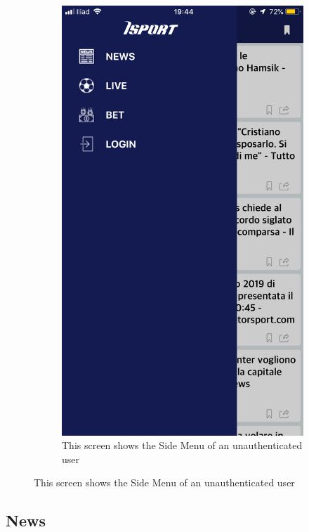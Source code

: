 \documentclass[numbers=noenddot, 12pt, a4paper, oneside]{scrbook}
\begin{document}
\begin{figure}[H]
\begin{subfigure}{.5\textwidth}
		\includegraphics[width=.8\linewidth]{images/Screen/SideLogout}
		\caption{This screen shows the Side Menu of an unauthenticated user}
	\end{subfigure}
\end{figure}



\subsection*{News}
\end{document}
